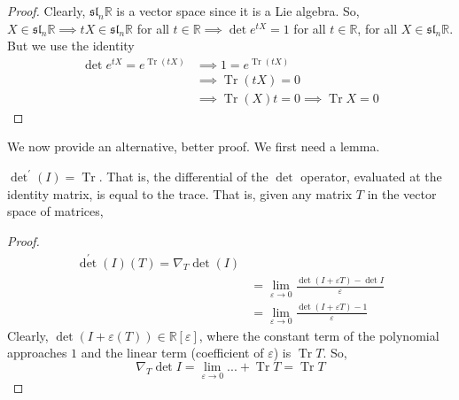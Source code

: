 \documentclass{article}
\DeclareMathOperator{\Tr}{Tr}
\begin{document}
    \begin{proof}
      Clearly, $\mathfrak{sl}_n \mathbb{R}$ is a vector space since it is a Lie algebra. So, $X \in \mathfrak{sl}_n \mathbb{R} \implies t X \in \mathfrak{sl}_n \mathbb{R}$ for all $t \in \mathbb{R} \implies \det{e^{tX}} = 1$ for all $t \in \mathbb{R}$, for all $X \in \mathfrak{sl}_n \mathbb{R}$. But we use the identity 
      \begin{align*}
        \det{e^{tX}} = e^{\Tr{(tX)}} & \implies 1 = e^{\Tr{(t X)}} \\
        & \implies \Tr{(tX)} = 0 \\
        & \implies \Tr{(X)} t = 0 \implies \Tr{X} = 0
      \end{align*}
    \end{proof}
    We now provide an alternative, better proof. We first need a lemma. 

    \begin{lemma}
      $\det^\prime (I) = \Tr$. That is, the differential of the $\det$ operator, evaluated at the identity matrix, is equal to the trace. That is, given any matrix $T$ in the vector space of matrices, 
    \end{lemma}
    \begin{proof}
      \begin{align*}
        \det^\prime (I) (T) = \nabla_T \det(I) \\
        & = \lim_{\varepsilon \rightarrow 0} \frac{\det{(I + \varepsilon T)} - \det{I}}{\varepsilon} \\
        & = \lim_{\varepsilon \rightarrow 0} \frac{\det{(I + \varepsilon T)} - 1}{\varepsilon}
      \end{align*}
      Clearly, $\det(I + \varepsilon(T)) \in \mathbb{R}[\varepsilon]$, where the constant term of the polynomial approaches $1$ and the linear term (coefficient of $\varepsilon$) is $\Tr{T}$. So, 
      \begin{equation}
        \nabla_T \det{I} = \lim_{\varepsilon \rightarrow 0} ... + \Tr{T} = \Tr{T}
      \end{equation}
    \end{proof}
\end{document}
